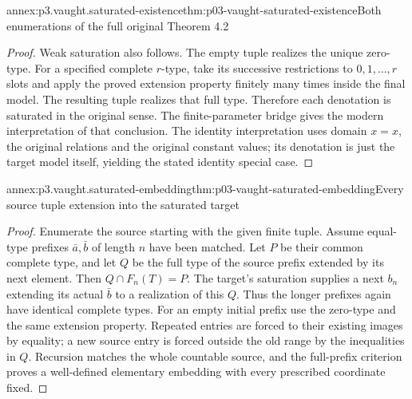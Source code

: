 \begin{annexitem}{annex:p3.vaught.saturated-existence}{thm:p03-vaught-saturated-existence}{Both enumerations of the full original Theorem 4.2}
\begin{proof}
Weak saturation also follows. The empty tuple realizes the unique
zero-type. For a specified complete \(r\)-type, take its successive
restrictions to \(0,1,\ldots,r\) slots and apply the proved extension
property finitely many times inside the final model.
The resulting tuple realizes that full type.
Therefore each denotation is saturated in the original sense.
The finite-parameter bridge gives the modern interpretation of
that conclusion. The identity interpretation uses domain \(x=x\),
the original relations and the original constant values; its
denotation is just the target model itself, yielding the stated
identity special case.
\end{proof}
\end{annexitem}

\begin{annexitem}{annex:p3.vaught.saturated-embedding}{thm:p03-vaught-saturated-embedding}{Every source tuple extension into the saturated target}
\begin{proof}
Enumerate the source starting with the given finite tuple.
Assume equal-type prefixes \(\bar a,\bar b\) of length \(n\)
have been matched. Let \(P\) be their common complete type,
and let \(Q\) be the full type of the source prefix extended
by its next element. Then \(Q\cap F_n(T)=P\).
The target's saturation supplies a next \(b_n\) extending its
actual \(\bar b\) to a realization of this \(Q\).
Thus the longer prefixes again have identical complete types.
For an empty initial prefix use the zero-type and the same
extension property. Repeated entries are forced to their existing
images by equality; a new source entry is forced outside the old
range by the inequalities in \(Q\).
Recursion matches the whole countable source, and the full-prefix
criterion proves a well-defined elementary embedding with every
prescribed coordinate fixed.
\end{proof}
\end{annexitem}

